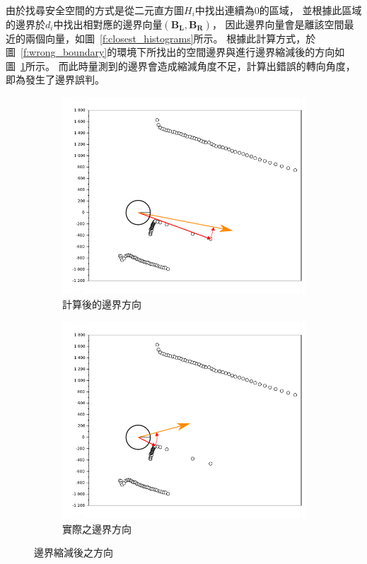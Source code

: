 由於找尋安全空間的方式是從二元直方圖$H_i$中找出連續為$0$的區域，
並根據此區域的邊界於$d_i$中找出相對應的邊界向量$(\mathbf{B_L},\mathbf{B_R})$，
因此邊界向量會是離該空間最近的兩個向量，如圖~\ref{f:closest_histograms}所示。
根據此計算方式，於圖~\ref{f:wrong_boundary}的環境下所找出的空間邊界與進行邊界縮減後的方向如圖~\ref{f:w_b_wrong_direction}所示。
而此時量測到的邊界會造成縮減角度不足，計算出錯誤的轉向角度，即為發生了邊界誤判。
\begin{figure}
	\centering
	\begin{subfigure}[t]{0.8\textwidth}
		\includegraphics[width=\textwidth]{figures/algorithm/w_b_wrong_direction}
		\caption{計算後的邊界方向}
		\label{f:w_b_wrong_direction}
	\end{subfigure}
	\begin{subfigure}[t]{0.8\textwidth}
		\includegraphics[width=\textwidth]{figures/algorithm/w_b_right_direction}
		\caption{實際之邊界方向}
		\label{f:w_b_right_direction}
	\end{subfigure}
	\caption{邊界縮減後之方向}
	\label{f:wrong_boundary_directions}
\end{figure}

